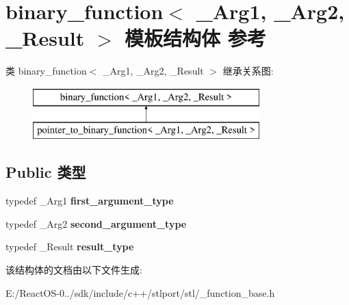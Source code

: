 \hypertarget{structbinary__function}{}\section{binary\+\_\+function$<$ \+\_\+\+Arg1, \+\_\+\+Arg2, \+\_\+\+Result $>$ 模板结构体 参考}
\label{structbinary__function}
类 binary\+\_\+function$<$ \+\_\+\+Arg1, \+\_\+\+Arg2, \+\_\+\+Result $>$ 继承关系图\+:\begin{figure}[H]
\begin{center}
\leavevmode
\includegraphics[height=2.000000cm]{structbinary__function}
\end{center}
\end{figure}
\subsection*{Public 类型}
\begin{DoxyCompactItemize}
\item 
\mbox{\label{structbinary__function_a8b2f9d8d7ca264786d10b0255d590e40}} 
typedef \+\_\+\+Arg1 {\bfseries first\+\_\+argument\+\_\+type}
\item 
\mbox{\label{structbinary__function_a9df15e914692ce2608c6977f09daf124}} 
typedef \+\_\+\+Arg2 {\bfseries second\+\_\+argument\+\_\+type}
\item 
\mbox{\label{structbinary__function_a2900c8741407711207fdac84a8060d4a}} 
typedef \+\_\+\+Result {\bfseries result\+\_\+type}
\end{DoxyCompactItemize}


该结构体的文档由以下文件生成\+:\begin{DoxyCompactItemize}
\item 
E\+:/\+React\+O\+S-\/0../sdk/include/c++/stlport/stl/\+\_\+function\+\_\+base.\+h\end{DoxyCompactItemize}
